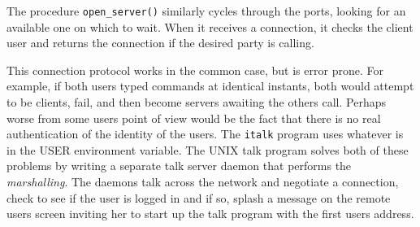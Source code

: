 The procedure \texttt{open\_server()} similarly cycles through the
ports, looking for an available one on which to wait. When it receives
a connection, it checks the client user and returns the connection if
the desired party is calling.


This connection protocol works in the common case, but is error prone.
For example, if both users typed commands at identical instants, both
would attempt to be clients, fail, and then become servers awaiting the
other{\textquotesingle}s call. Perhaps worse from some
users{\textquotesingle} point of view would be the fact that there is
no real authentication of the identity of the users. The \texttt{italk}
program uses whatever is in the USER environment variable. The UNIX talk program solves both
of these problems by writing a separate talk server daemon that
performs the \textit{marshalling}. The daemons talk across the network
and negotiate a connection, check to see if the user is logged in and
if so, splash a message on the remote user{\textquotesingle}s screen
inviting her to start up the talk program with the first
user{\textquotesingle}s address.

